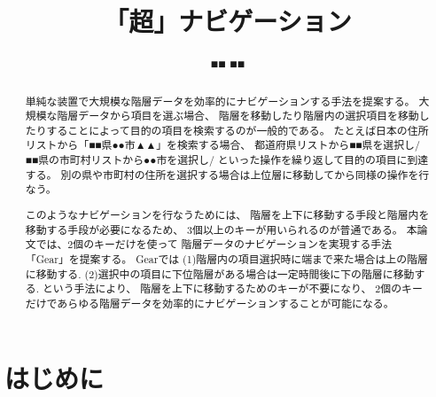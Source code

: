 \documentclass[twoside]{wiss}
\def\GEAR{\textsf{Gear}}
\begin{document}
\title{「超」ナビゲーション}
\etitle{} %

\author{■■ ■■}

\begin{abstract}
単純な装置で大規模な階層データを効率的にナビゲーションする手法を提案する。
%
大規模な階層データから項目を選ぶ場合、
階層を移動したり階層内の選択項目を移動したりすることによって目的の項目を検索するのが一般的である。
たとえば日本の住所リストから「■■県●●市▲▲」を検索する場合、
都道府県リストから■■県を選択し/■■県の市町村リストから●●市を選択し/
といった操作を繰り返して目的の項目に到達する。
別の県や市町村の住所を選択する場合は上位層に移動してから同様の操作を行なう。

このようなナビゲーションを行なうためには、
階層を上下に移動する手段と階層内を移動する手段が必要になるため、
3個以上のキーが用いられるのが普通である。
%
本論文では、2個のキーだけを使って
階層データのナビゲーションを実現する手法「{\GEAR}」を提案する。
{\GEAR}では
(1)階層内の項目選択時に端まで来た場合は上の階層に移動する.
(2)選択中の項目に下位階層がある場合は一定時間後に下の階層に移動する.
という手法により、
階層を上下に移動するためのキーが不要になり、
2個のキーだけであらゆる階層データを効率的にナビゲーションすることが可能になる。
\end{abstract}

\maketitle

\section{はじめに}

\end{document}
